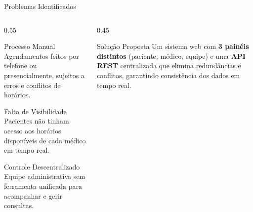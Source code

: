 \documentclass[xcolor={table}]{beamer}
\begin{document}
\begin{frame}{Problemas Identificados}
    \begin{columns}
        \begin{column}{0.55\textwidth}
            \begin{alertblock}{Processo Manual}
                Agendamentos feitos por telefone ou presencialmente, sujeitos a erros e conflitos de horários.
            \end{alertblock}
            \vspace{0.2cm}
            \begin{alertblock}{Falta de Visibilidade}
                Pacientes não tinham acesso aos horários disponíveis de cada médico em tempo real.
            \end{alertblock}
            \vspace{0.2cm}
            \begin{alertblock}{Controle Descentralizado}
                Equipe administrativa sem ferramenta unificada para acompanhar e gerir consultas.
            \end{alertblock}
        \end{column}
        \begin{column}{0.45\textwidth}
            \begin{exampleblock}{Solução Proposta}
                \justifying
                \small
                Um sistema web com \textbf{3 painéis distintos} (paciente, médico, equipe) e uma
                \textbf{API REST} centralizada que elimina redundâncias e conflitos,
                garantindo consistência dos dados em tempo real.
            \end{exampleblock}
        \end{column}
    \end{columns}
\end{frame}
\end{document}
